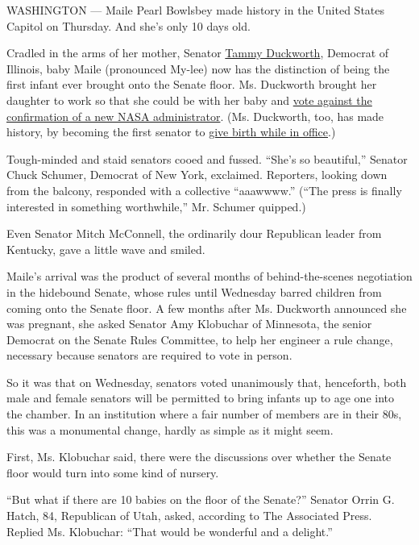 WASHINGTON --- Maile Pearl Bowlsbey made history in the United States
Capitol on Thursday. And she's only 10 days old.

Cradled in the arms of her mother, Senator
\href{https://www.nytimes.com/2020/07/08/us/politics/tucker-carlson-tammy-duckworth.html}{Tammy
Duckworth}, Democrat of Illinois, baby Maile (pronounced My-lee) now has
the distinction of being the first infant ever brought onto the Senate
floor. Ms. Duckworth brought her daughter to work so that she could be
with her baby and
\href{https://www.nytimes.com/2018/04/19/science/jim-bridenstine-nasa.html}{vote
against the confirmation of a new NASA administrator}. (Ms. Duckworth,
too, has made history, by becoming the first senator to
\href{https://mobile.nytimes.com/2018/04/09/us/politics/tammy-duckworth-birth.html}{give
birth while in office}.)

Tough-minded and staid senators cooed and fussed. ``She's so
beautiful,'' Senator Chuck Schumer, Democrat of New York, exclaimed.
Reporters, looking down from the balcony, responded with a collective
``aaawwww.'' (``The press is finally interested in something
worthwhile,'' Mr. Schumer quipped.)

Even Senator Mitch McConnell, the ordinarily dour Republican leader from
Kentucky, gave a little wave and smiled.

Maile's arrival was the product of several months of behind-the-scenes
negotiation in the hidebound Senate, whose rules until Wednesday barred
children from coming onto the Senate floor. A few months after Ms.
Duckworth announced she was pregnant, she asked Senator Amy Klobuchar of
Minnesota, the senior Democrat on the Senate Rules Committee, to help
her engineer a rule change, necessary because senators are required to
vote in person.

So it was that on Wednesday, senators voted unanimously that,
henceforth, both male and female senators will be permitted to bring
infants up to age one into the chamber. In an institution where a fair
number of members are in their 80s, this was a monumental change, hardly
as simple as it might seem.

First, Ms. Klobuchar said, there were the discussions over whether the
Senate floor would turn into some kind of nursery.

``But what if there are 10 babies on the floor of the Senate?'' Senator
Orrin G. Hatch, 84, Republican of Utah, asked, according to The
Associated Press. Replied Ms. Klobuchar: ``That would be wonderful and a
delight.''


